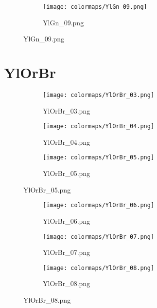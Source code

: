 \documentclass{article}%
\begin{document}
%
\hspace{1cm}\hfill%


\begin{figure}[h!]%
\begin{subfigure}[b]{0.3\linewidth}%
\texttt{[image: colormaps/YlGn\_09.png]}%
\caption{YlGn\_09.png}%
\end{subfigure}%
\end{figure}

%
\newpage%
\section{YlOrBr}%
\label{sec:YlOrBr}%
\hspace{1cm}\hfill%
\hspace{1cm}\hfill%
\hspace{1cm}\hfill%


\begin{figure}[h!]%
\begin{subfigure}[b]{0.3\linewidth}%
\texttt{[image: colormaps/YlOrBr\_03.png]}%
\caption{YlOrBr\_03.png}%
\end{subfigure}%
\begin{subfigure}[b]{0.3\linewidth}%
\texttt{[image: colormaps/YlOrBr\_04.png]}%
\caption{YlOrBr\_04.png}%
\end{subfigure}%
\begin{subfigure}[b]{0.3\linewidth}%
\texttt{[image: colormaps/YlOrBr\_05.png]}%
\caption{YlOrBr\_05.png}%
\end{subfigure}%
\end{figure}

%
\hspace{1cm}\hfill%
\hspace{1cm}\hfill%
\hspace{1cm}\hfill%


\begin{figure}[h!]%
\begin{subfigure}[b]{0.3\linewidth}%
\texttt{[image: colormaps/YlOrBr\_06.png]}%
\caption{YlOrBr\_06.png}%
\end{subfigure}%
\begin{subfigure}[b]{0.3\linewidth}%
\texttt{[image: colormaps/YlOrBr\_07.png]}%
\caption{YlOrBr\_07.png}%
\end{subfigure}%
\begin{subfigure}[b]{0.3\linewidth}%
\texttt{[image: colormaps/YlOrBr\_08.png]}%
\caption{YlOrBr\_08.png}%
\end{subfigure}%
\end{figure}
\end{document}
